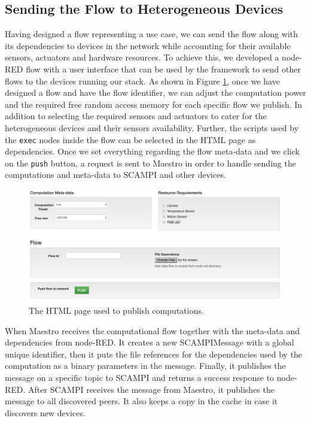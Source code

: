 \subsection{Sending the Flow to Heterogeneous Devices}

Having designed a flow representing a use case, we can send the flow along with its dependencies to devices in the network while accounting for their available sensors, actuators  and hardware resources. To achieve this, we developed a node-RED flow with  a user interface that can be used by the framework to send other flows to the devices running our stack. As shown in Figure \ref{fig:html-publish}, once we have designed a flow and have the flow identifier, we can adjust the computation power and the required free random access memory for each specific flow we publish. In addition to selecting the required sensors and actuators to cater for the heterogeneous devices and their sensors availability. Further, the scripts used by the \verb|exec| nodes inside the flow can be selected in the HTML page as dependencies. Once we set everything regarding the flow meta-data and we click on the \verb|push| button, a request is sent to Maestro in order to handle sending the computations and meta-data to SCAMPI and other devices.
\begin{figure}[H]
\centering
\includegraphics[scale=0.5]{images/html-publish.png}
\caption{The HTML page used to publish computations.}
\label{fig:html-publish}
\end{figure}

\noindent When Maestro receives the computational flow  together with the meta-data and dependencies from  node-RED. It creates a new SCAMPIMessage with  a global unique identifier, then it puts the  file references for the dependencies used by the computation as a binary parameters in the message. Finally, it publishes the message on a specific topic to SCAMPI and returns a success response to node-RED. After SCAMPI receives the message from Maestro, it publishes the message to all discovered peers. It also keeps a copy in the cache in case it discovers new devices. 


